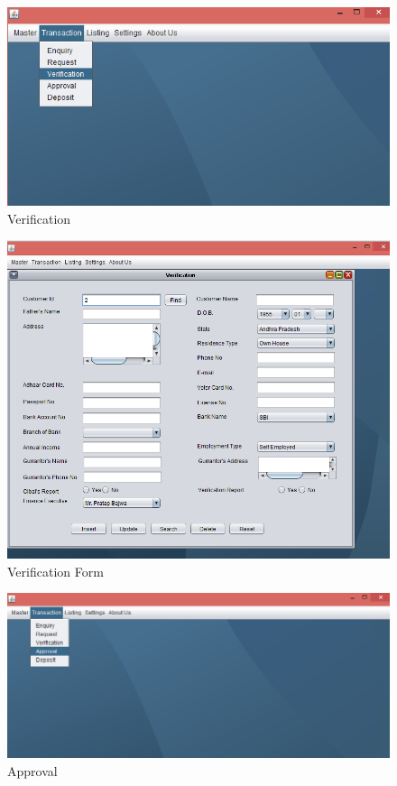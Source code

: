 \begin{figure}[ht]
\begin{center}
\includegraphics[scale=0.5]{images/image25.png}
\end{center}
\caption{Verification}
\label{Verification}
\end{figure}


\begin{figure}[ht]
\begin{center}
\includegraphics[scale=0.5]{images/image26.png}
\end{center}
\caption{Verification Form}
\label{Verification Form}
\end{figure}

\begin{figure}[ht]
\begin{center}
\includegraphics[scale=0.5]{images/image27.png}
\end{center}
\caption{Approval}
\label{Approval}
\end{figure}



